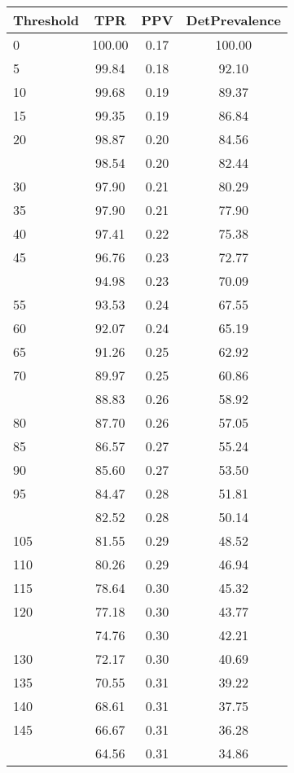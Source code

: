 \begin{table}[ht]
\centering
\begin{tabular}{lccc}
  \toprule
Threshold & TPR & PPV & DetPrevalence \\ 
  \midrule
0 & 100.00 & 0.17 & 100.00 \\ 
  5 & 99.84 & 0.18 & 92.10 \\ 
  10 & 99.68 & 0.19 & 89.37 \\ 
  15 & 99.35 & 0.19 & 86.84 \\ 
  20 & 98.87 & 0.20 & 84.56 \\ 
   \addlinespace
25 & 98.54 & 0.20 & 82.44 \\ 
  30 & 97.90 & 0.21 & 80.29 \\ 
  35 & 97.90 & 0.21 & 77.90 \\ 
  40 & 97.41 & 0.22 & 75.38 \\ 
  45 & 96.76 & 0.23 & 72.77 \\ 
   \addlinespace
50 & 94.98 & 0.23 & 70.09 \\ 
  55 & 93.53 & 0.24 & 67.55 \\ 
  60 & 92.07 & 0.24 & 65.19 \\ 
  65 & 91.26 & 0.25 & 62.92 \\ 
  70 & 89.97 & 0.25 & 60.86 \\ 
   \addlinespace
75 & 88.83 & 0.26 & 58.92 \\ 
  80 & 87.70 & 0.26 & 57.05 \\ 
  85 & 86.57 & 0.27 & 55.24 \\ 
  90 & 85.60 & 0.27 & 53.50 \\ 
  95 & 84.47 & 0.28 & 51.81 \\ 
   \addlinespace
100 & 82.52 & 0.28 & 50.14 \\ 
  105 & 81.55 & 0.29 & 48.52 \\ 
  110 & 80.26 & 0.29 & 46.94 \\ 
  115 & 78.64 & 0.30 & 45.32 \\ 
  120 & 77.18 & 0.30 & 43.77 \\ 
   \addlinespace
125 & 74.76 & 0.30 & 42.21 \\ 
  130 & 72.17 & 0.30 & 40.69 \\ 
  135 & 70.55 & 0.31 & 39.22 \\ 
  140 & 68.61 & 0.31 & 37.75 \\ 
  145 & 66.67 & 0.31 & 36.28 \\ 
   \addlinespace
150 & 64.56 & 0.31 & 34.86 \\ 

\end{tabular}
\end{table}

